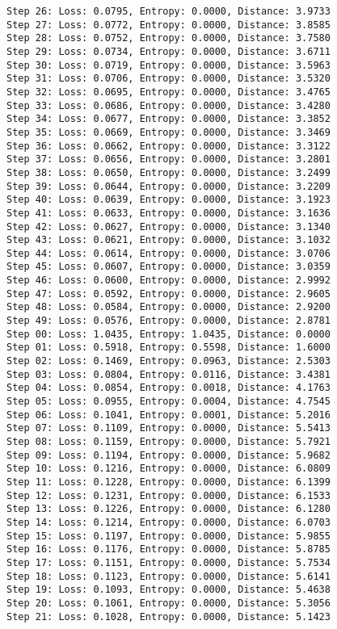 \documentclass[11pt]{article}
\begin{document}
\begin{Verbatim}[commandchars=\\\{\}]
Step 26: Loss: 0.0795, Entropy: 0.0000, Distance: 3.9733
Step 27: Loss: 0.0772, Entropy: 0.0000, Distance: 3.8585
Step 28: Loss: 0.0752, Entropy: 0.0000, Distance: 3.7580
Step 29: Loss: 0.0734, Entropy: 0.0000, Distance: 3.6711
Step 30: Loss: 0.0719, Entropy: 0.0000, Distance: 3.5963
Step 31: Loss: 0.0706, Entropy: 0.0000, Distance: 3.5320
Step 32: Loss: 0.0695, Entropy: 0.0000, Distance: 3.4765
Step 33: Loss: 0.0686, Entropy: 0.0000, Distance: 3.4280
Step 34: Loss: 0.0677, Entropy: 0.0000, Distance: 3.3852
Step 35: Loss: 0.0669, Entropy: 0.0000, Distance: 3.3469
Step 36: Loss: 0.0662, Entropy: 0.0000, Distance: 3.3122
Step 37: Loss: 0.0656, Entropy: 0.0000, Distance: 3.2801
Step 38: Loss: 0.0650, Entropy: 0.0000, Distance: 3.2499
Step 39: Loss: 0.0644, Entropy: 0.0000, Distance: 3.2209
Step 40: Loss: 0.0639, Entropy: 0.0000, Distance: 3.1923
Step 41: Loss: 0.0633, Entropy: 0.0000, Distance: 3.1636
Step 42: Loss: 0.0627, Entropy: 0.0000, Distance: 3.1340
Step 43: Loss: 0.0621, Entropy: 0.0000, Distance: 3.1032
Step 44: Loss: 0.0614, Entropy: 0.0000, Distance: 3.0706
Step 45: Loss: 0.0607, Entropy: 0.0000, Distance: 3.0359
Step 46: Loss: 0.0600, Entropy: 0.0000, Distance: 2.9992
Step 47: Loss: 0.0592, Entropy: 0.0000, Distance: 2.9605
Step 48: Loss: 0.0584, Entropy: 0.0000, Distance: 2.9200
Step 49: Loss: 0.0576, Entropy: 0.0000, Distance: 2.8781
Step 00: Loss: 1.0435, Entropy: 1.0435, Distance: 0.0000
Step 01: Loss: 0.5918, Entropy: 0.5598, Distance: 1.6000
Step 02: Loss: 0.1469, Entropy: 0.0963, Distance: 2.5303
Step 03: Loss: 0.0804, Entropy: 0.0116, Distance: 3.4381
Step 04: Loss: 0.0854, Entropy: 0.0018, Distance: 4.1763
Step 05: Loss: 0.0955, Entropy: 0.0004, Distance: 4.7545
Step 06: Loss: 0.1041, Entropy: 0.0001, Distance: 5.2016
Step 07: Loss: 0.1109, Entropy: 0.0000, Distance: 5.5413
Step 08: Loss: 0.1159, Entropy: 0.0000, Distance: 5.7921
Step 09: Loss: 0.1194, Entropy: 0.0000, Distance: 5.9682
Step 10: Loss: 0.1216, Entropy: 0.0000, Distance: 6.0809
Step 11: Loss: 0.1228, Entropy: 0.0000, Distance: 6.1399
Step 12: Loss: 0.1231, Entropy: 0.0000, Distance: 6.1533
Step 13: Loss: 0.1226, Entropy: 0.0000, Distance: 6.1280
Step 14: Loss: 0.1214, Entropy: 0.0000, Distance: 6.0703
Step 15: Loss: 0.1197, Entropy: 0.0000, Distance: 5.9855
Step 16: Loss: 0.1176, Entropy: 0.0000, Distance: 5.8785
Step 17: Loss: 0.1151, Entropy: 0.0000, Distance: 5.7534
Step 18: Loss: 0.1123, Entropy: 0.0000, Distance: 5.6141
Step 19: Loss: 0.1093, Entropy: 0.0000, Distance: 5.4638
Step 20: Loss: 0.1061, Entropy: 0.0000, Distance: 5.3056
Step 21: Loss: 0.1028, Entropy: 0.0000, Distance: 5.1423

\end{Verbatim}
\end{document}
